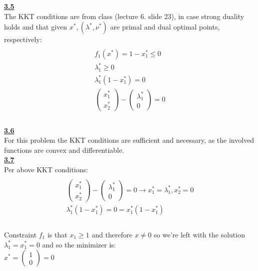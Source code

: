 \documentclass[fleqn]{article}
\begin{document}
\underline{\textbf{3.5}} \\

The KKT conditions are from class (lecture 6. slide 23), in case strong duality holds and that given $x^*,(\lambda^*, \nu^*)$ are primal and dual optimal points, respectively: \\

\begin{multline*} \\
f_1(x^*) = 1-x_1^* \leq 0 \\
\lambda_1^* \geq 0 \\
\lambda_1^*(1-x_1^*)=0 \\
\begin{pmatrix}
	x_1^* \\ x_2^*
\end{pmatrix} -
\begin{pmatrix}
	\lambda_1^* \\ 0
\end{pmatrix}  =0 \\
\end{multline*} \\

\underline{\textbf{3.6}} \\
For this problem the KKT conditions are sufficient and necessary, as the involved functions are convex and differentiable. \\

\underline{\textbf{3.7}} \\
Per above KKT conditions: \\
\begin{multline*} \\
\begin{pmatrix}
	x_1^* \\ x_2^*
\end{pmatrix} -
\begin{pmatrix}
	\lambda_1^* \\ 0
\end{pmatrix}  =0 
\rightarrow 
x_1^*=\lambda_1^*, x_2^*=0 \\
\lambda_1^*(1-x_1^*)=0 = x_1^*(1-x_1^*) \\
\end{multline*} \\
Constraint $f_1$ is that $x_1 \geq 1$ and therefore $x \neq 0$ so we're left with the solution $\lambda_1^*=x_1^*=0$ and so the minimizer is: \\
$ x^* = 
\begin{pmatrix}
	1 \\ 0
\end{pmatrix}  =0
$
\end{document}
